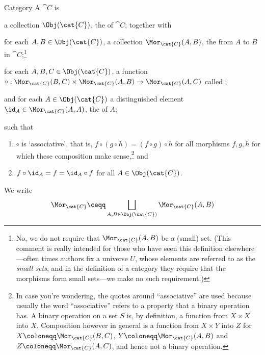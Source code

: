 \begin{dfn}{Category}{}
A  $\cat{C}$ is
\begin{data}
\item a collection $\Obj (\cat{C})$, the  of $\cat{C}$; together with
\item for each $A,B\in \Obj (\cat{C})$, a collection $\Mor _{\cat{C}}(A,B)$, the  from $A$ to $B$ in $\cat{C}$;\footnote{No, we do not require that $\Mor _{\cat{C}}(A,B)$ be a (small) set.  (This comment is really intended for those who have seen this definition elsewhere---often times authors fix a universe $U$, whose elements are referred to as the \emph{small sets}, and in the definition of a category they require that the morphisms form small sets---we make no such requirement.)}
\item for each $A,B,C\in \Obj (\cat{C})$, a function $\circ :\Mor _{\cat{C}}(B,C)\times \Mor _{\cat{C}}(A,B)\rightarrow \Mor _{\cat{C}}(A,C)$ called ;
\item and for each $A\in \Obj (\cat{C})$ a distinguished element $\id _{A}\in \Mor _{\cat{C}}(A,A)$, the  of $A$;
\end{data}
such that
\begin{enumerate}
\item $\circ$ is `associative', that is, $f\circ (g\circ h)=(f\circ g)\circ h$ for all morphisms $f,g,h$ for which these composition make sense,\footnote{In case you're wondering, the quotes around ``associative'' are used because usually the word ``associative'' refers to a property that a binary operation has.  A binary operation on a set $S$ is, by definition, a function from $X\times X$ into $X$.  Composition however in general is a function from $X\times Y$ into $Z$ for $X\coloneqq \Mor _{\cat{C}}(B,C)$, $Y\coloneqq \Mor _{\cat{C}}(A,B)$ and $Z\coloneqq \Mor _{\cat{C}}(A,C)$, and hence not a binary operation.} and
\item $f\circ \id _A=f=\id _A\circ f$ for all $A\in \Obj (\cat{C})$.
\end{enumerate}
\begin{rmk}
We write
\begin{equation}
\Mor _{\cat{C}}\ceqq \bigsqcup _{A,B\in \Obj (\cat{C})}\Mor _{\cat{C}}(A,B)
\end{equation}

\end{rmk}
\end{dfn}
